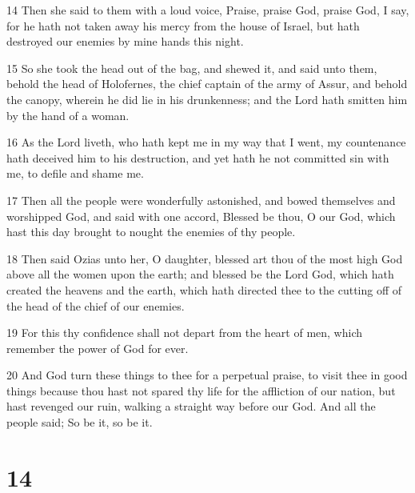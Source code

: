 \par 14 Then she said to them with a loud voice, Praise, praise God, praise God, I say, for he hath not taken away his mercy from the house of Israel, but hath destroyed our enemies by mine hands this night.
\par 15 So she took the head out of the bag, and shewed it, and said unto them, behold the head of Holofernes, the chief captain of the army of Assur, and behold the canopy, wherein he did lie in his drunkenness; and the Lord hath smitten him by the hand of a woman.
\par 16 As the Lord liveth, who hath kept me in my way that I went, my countenance hath deceived him to his destruction, and yet hath he not committed sin with me, to defile and shame me.
\par 17 Then all the people were wonderfully astonished, and bowed themselves and worshipped God, and said with one accord, Blessed be thou, O our God, which hast this day brought to nought the enemies of thy people.
\par 18 Then said Ozias unto her, O daughter, blessed art thou of the most high God above all the women upon the earth; and blessed be the Lord God, which hath created the heavens and the earth, which hath directed thee to the cutting off of the head of the chief of our enemies.
\par 19 For this thy confidence shall not depart from the heart of men, which remember the power of God for ever.
\par 20 And God turn these things to thee for a perpetual praise, to visit thee in good things because thou hast not spared thy life for the affliction of our nation, but hast revenged our ruin, walking a straight way before our God. And all the people said; So be it, so be it.

\chapter{14}

